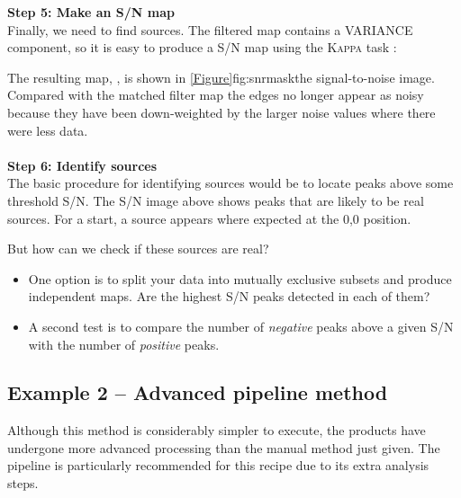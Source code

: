 \documentclass[11pt,oneside,chapters]{starlink}
\begin{document}

\textbf{Step 5: Make an S/N map}\\
Finally, we need to find sources. The filtered map contains a
VARIANCE component, so it is easy to produce a S/N map using the
\textsc{Kappa} task \makesnr:
\begin{terminalv}
\end{terminalv}

The resulting map, , is shown in
\cref{Figure}{fig:snrmask}{the signal-to-noise image}. Compared with the
matched filter map the
edges no longer appear as noisy because they have been down-weighted
by the larger noise values where there were less data.
\\ \\
\textbf{Step 6: Identify sources}\\
The basic procedure for identifying sources would be to locate peaks
above some threshold S/N. The S/N image above shows peaks that are
likely to be real sources. For a start, a source appears where
expected at the 0,0 position.

But how can we check if these sources are real?
\begin{itemize}

\item One option is to split your data into mutually exclusive subsets
  and produce independent maps. Are the highest S/N peaks detected in each of
  them?
\item A second test is to compare the number of \emph{negative} peaks above
  a given S/N with the number of \emph{positive} peaks.
\end{itemize}

\subsection{Example 2 -- Advanced pipeline method}
\label{sec:jk}

Although this method is considerably simpler to execute, the products
have undergone more advanced processing than the manual method just
given. The pipeline is particularly recommended for this recipe due to
its extra analysis steps.
\end{document}
